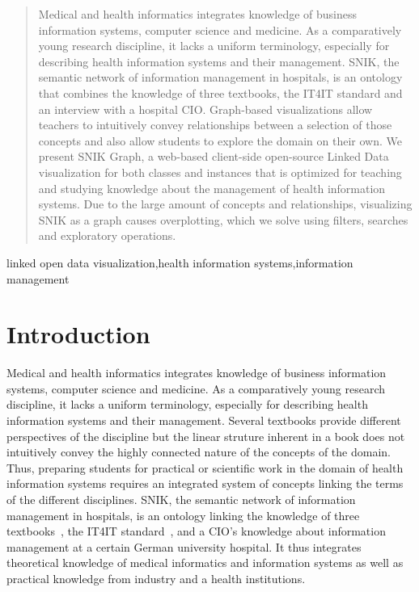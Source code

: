 \documentclass[conference]{IEEEtran}
\begin{document}
\begin{abstract}
Medical and health informatics integrates knowledge of business information systems, computer science and medicine.
As a comparatively young research discipline, it lacks a uniform terminology, especially for describing health information systems and their management.
SNIK, the semantic network of information management in hospitals, is an ontology that combines the knowledge of three textbooks, the IT4IT standard and an interview with a hospital CIO.
Graph-based visualizations allow teachers to intuitively convey relationships between a selection of those concepts and also allow students to explore the domain on their own.
We present SNIK Graph, a web-based client-side open-source Linked Data visualization for both classes and instances that is optimized for teaching and studying knowledge about the management of health information systems.
Due to the large amount of concepts and relationships, visualizing SNIK as a graph causes overplotting, which we solve using filters, searches and exploratory operations. 
\end{abstract}
\begin{IEEEkeywords}
linked open data visualization,health information systems,information management
\end{IEEEkeywords}

\section{Introduction}%
Medical and health informatics integrates knowledge of business information systems, computer science and medicine.
As a comparatively young research discipline, it lacks a uniform terminology, especially for describing health information systems and their management.
Several textbooks provide different perspectives of the discipline but the linear struture inherent in a book does not intuitively convey the highly connected nature of the concepts of the domain.
Thus, preparing students for practical or scientific work in the domain of health information systems requires an integrated system of concepts linking the terms of the different disciplines.
SNIK, the semantic network of information management in hospitals, is an ontology linking the knowledge of three textbooks~\cite{bb,ob,he}, the IT4IT standard~\cite{it4it}, and a CIO's knowledge about information management at a certain German university hospital.
It thus integrates theoretical knowledge of medical informatics and information systems as well as practical knowledge from industry and a health institutions.
\end{document}
